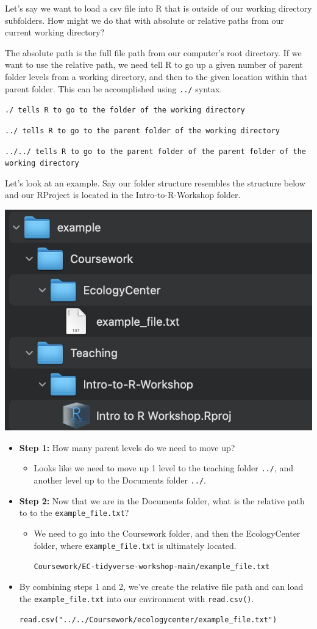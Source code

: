 \documentclass[
]{book}
\providecommand{\tightlist}{%
  \setlength{\itemsep}{0pt}\setlength{\parskip}{0pt}}
\begin{document}
Let's say we want to load a csv file into R that is outside of our working directory subfolders. How might we do that with absolute or relative paths from our current working directory?

The absolute path is the full file path from our computer's root directory. If we want to use the relative path, we need tell R to go up a given number of parent folder levels from a working directory, and then to the given location within that parent folder. This can be accomplished using \texttt{../} syntax.

\texttt{./\ tells\ R\ to\ go\ to\ the\ folder\ of\ the\ working\ directory}

\texttt{../\ tells\ R\ to\ go\ to\ the\ parent\ folder\ of\ the\ working\ directory}

\texttt{../../\ tells\ R\ to\ go\ to\ the\ parent\ folder\ of\ the\ parent\ folder\ of\ the\ working\ directory}

Let's look at an example. Say our folder structure resembles the structure below and our RProject is located in the Intro-to-R-Workshop folder.

\includegraphics[width=0.5\linewidth,height=\textheight,keepaspectratio]{./docs/files/folder_hierarchy.png}

\begin{itemize}
\item
  \textbf{Step 1:} How many parent levels do we need to move up?

  \begin{itemize}
  \tightlist
  \item
    Looks like we need to move up 1 level to the teaching folder \texttt{../}, and another level up to the Documents folder \texttt{../}.
  \end{itemize}
\item
  \textbf{Step 2:} Now that we are in the Documents folder, what is the relative path to to the \texttt{example\_file.txt}?

  \begin{itemize}
  \item
    We need to go into the Coursework folder, and then the EcologyCenter folder, where
    \texttt{example\_file.txt} is ultimately located.

    \texttt{Coursework/EC-tidyverse-workshop-main/example\_file.txt}
  \end{itemize}
\item
  By combining steps 1 and 2, we've create the relative file path and can load the \texttt{example\_file.txt} into our environment with \texttt{read.csv()}.

  \texttt{read.csv("../../Coursework/ecologycenter/example\_file.txt")}
\end{itemize}
\end{document}
